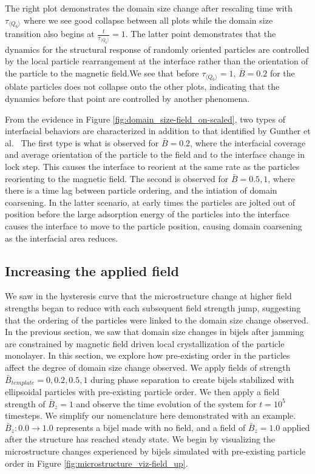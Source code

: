 The right plot demonstrates the domain size change after rescaling time
with \(\tau_{\langle Q_6 \rangle}\) where we see good collapse between
all plots while the domain size transition also begins at
\(\frac{t}{\tau_{\langle Q_6 \rangle}} = 1\). The latter point
demonstrates that the dynamics for the structural response of randomly
oriented particles are controlled by the local particle rearrangement at
the interface rather than the orientation of the particle to the
magnetic field.We see that before \(\tau_{\langle Q_6 \rangle} = 1\),
\(\bar{B} = 0.2\) for the oblate particles does not collapse onto the
other plots, indicating that the dynamics before that point are
controlled by another phenomena.

From the evidence in Figure \ref{fig:domain_size-field_on-scaled}, two
types of interfacial behaviors are characterized in addition to that
identified by Gunther et al.~\cite{gunther_timescales_2014} The first
type is what is observed for \(\bar{B} = 0.2\), where the interfacial
coverage and average orientation of the particle to the field and to the
interface change in lock step. This causes the interface to reorient at
the same rate as the particles reorienting to the magnetic field. The
second is observed for \(\bar{B} = 0.5, 1\), where there is a time lag
between particle ordering, and the intiation of domain coarsening. In
the latter scenario, at early times the particles are jolted out of
position before the large adsorption energy of the particles into the
interface causes the interface to move to the particle position, causing
domain coarsening as the interfacial area reduces.

\subsection{Increasing the applied
field}\label{increasing-the-applied-field}

We saw in the hysteresis curve that the microstructure change at higher
field strengths began to reduce with each subsequent field strength
jump, suggesting that the ordering of the particles were linked to the
domain size change observed. In the previous section, we saw that domain
size changes in bijels after jamming are constrained by magnetic field
driven local crystallization of the particle monolayer. In this section,
we explore how pre-existing order in the particles affect the degree of
domain size change observed. We apply fields of strength
\(\bar{B}_{template} = 0, 0.2, 0.5, 1\) during phase separation to
create bijels stabilized with ellipsoidal particles with pre-existing
particle order. We then apply a field strength of \(\bar{B}_z = 1\) and
observe the time evolution of the system for \(t = 10^5\) timesteps. We
simplify our nomenclature here demonstrated with an example.
\(\bar{B}_z: 0.0 \rightarrow 1.0\) represents a bijel made with no
field, and a field of \(\bar{B}_z = 1.0\) applied after the structure
has reached steady state. We begin by visualizing the microstructure
changes experienced by bijels simulated with pre-existing particle order
in Figure \ref{fig:microstructure_viz-field_up}.

